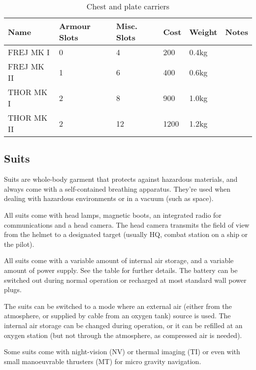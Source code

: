 \begin{table}
  \caption{Chest and plate carriers}
  \label{tab:Carriers}
  \begin{center}
    \begin{tabular}{| l | l | l | l | l | l |}

      \hline
      \textbf{Name} & \textbf{Armour Slots} & \textbf{Misc. Slots} &
      \textbf{Cost} & \textbf{Weight} & \textbf{Notes} \\ \hline

      FREJ MK I   & 0 &  4 &  200 & 0.4kg & \\ \hline
      FREJ MK II  & 1 &  6 &  400 & 0.6kg & \\ \hline

      THOR MK I   & 2 &  8 &  900 & 1.0kg & \\ \hline
      THOR MK II  & 2 & 12 & 1200 & 1.2kg & \\ \hline

    \end{tabular}
  \end{center}
\end{table}

\subsection{Suits}

Suits are whole-body garment that protects against hazardous materials, and
always come with a self-contained breathing apparatus. They're used when dealing
with hazardous environments or in a vacuum (such as space).

All suits come with head lamps, magnetic boots, an integrated radio for
communications and a head camera. The head camera transmits the field of view
from the helmet to a designated target (usually HQ, combat station on a ship or
the pilot).

All suits come with a variable amount of internal air storage, and a variable
amount of power supply. See the table for further details. The battery can be
switched out during normal operation or recharged at most standard wall power
plugs.

The suits can be switched to a mode where an external air (either from the
atmosphere, or supplied by cable from an oxygen tank) source is used.  The
internal air storage can be changed during operation, or it can be refilled at
an oxygen station (but not through the atmosphere, as compressed air is needed).

Some suits come with night-vision (NV) or thermal imaging (TI) or even with
small manoeuvrable thrusters (MT) for micro gravity navigation.

